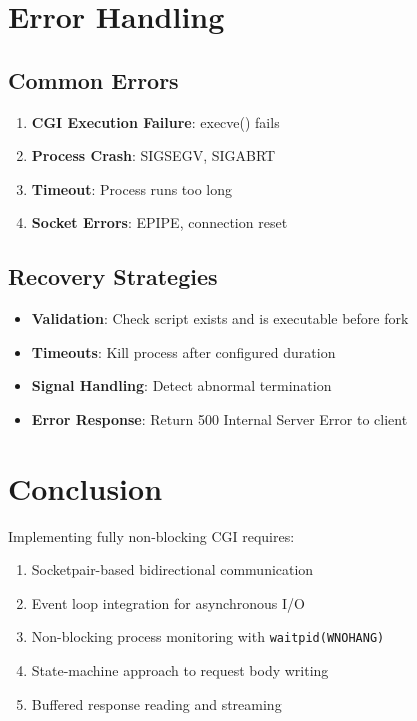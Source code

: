 \documentclass[12pt,a4paper]{article}
\begin{document}
\section{Error Handling}

\subsection{Common Errors}

\begin{enumerate}
    \item \textbf{CGI Execution Failure}: execve() fails
    \item \textbf{Process Crash}: SIGSEGV, SIGABRT
    \item \textbf{Timeout}: Process runs too long
    \item \textbf{Socket Errors}: EPIPE, connection reset
\end{enumerate}

\subsection{Recovery Strategies}

\begin{itemize}
    \item \textbf{Validation}: Check script exists and is executable before fork
    \item \textbf{Timeouts}: Kill process after configured duration
    \item \textbf{Signal Handling}: Detect abnormal termination
    \item \textbf{Error Response}: Return 500 Internal Server Error to client
\end{itemize}

\section{Conclusion}

Implementing fully non-blocking CGI requires:
\begin{enumerate}
    \item Socketpair-based bidirectional communication
    \item Event loop integration for asynchronous I/O
    \item Non-blocking process monitoring with \texttt{waitpid(WNOHANG)}
    \item State-machine approach to request body writing
    \item Buffered response reading and streaming
\end{enumerate}
\end{document}
